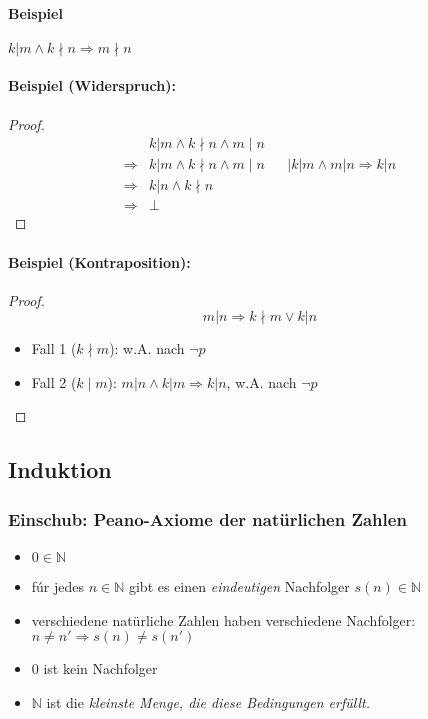 \paragraph{Beispiel}
$k|m\land k\nmid n \Rightarrow m\nmid n$
\paragraph{Beispiel (Widerspruch):}
\begin{proof}
\begin{align*}
&k|m\land k\nmid n \land m\mid n \\
\Rightarrow &k|m\land k\nmid n \land m\mid n && \mid k|m \land m|n \Rightarrow k|n \\
\Rightarrow &k|n \land k\nmid n \\
\Rightarrow &\bot
\end{align*}
\end{proof}

\paragraph{Beispiel (Kontraposition):}
\begin{proof}
\[
m|n \Rightarrow k\nmid m \lor k|n
\]
\begin{itemize}
\item Fall 1 ($k\nmid m$): w.A. nach $\neg p$
\item Fall 2 ($k\mid m$): $m|n \land k|m \Rightarrow k|n$, w.A. nach $\neg p$
\end{itemize}
\end{proof}

\subsection{Induktion}
\subsubsection{Einschub: Peano-Axiome der natürlichen Zahlen}
\begin{itemize}
\item $0\in\mathbb{N}$
\item fúr jedes $n\in\mathbb{N}$ gibt es einen \emph{eindeutigen} Nachfolger $s(n)\in\mathbb{N}$
\item verschiedene natürliche Zahlen haben verschiedene Nachfolger:\\
$n\neq n' \Rightarrow s(n) \neq s(n')$
\item $0$ ist kein Nachfolger
\item $\mathbb{N}$ ist die \emph{kleinste Menge, die diese Bedingungen erfüllt.}
\end{itemize}


